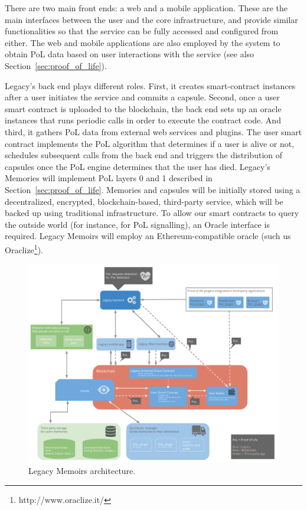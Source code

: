 There are two main front ends: a web and a mobile application. These are the main interfaces between the user and the core infrastructure, and provide similar functionalities so that the service can be fully accessed and configured from either.
The web and mobile applications are also employed by the system to obtain PoL data based on user interactions with the service (see also Section~\ref{sec:proof_of_life}).

Legacy’s back end plays different roles. First, it creates smart-contract instances after a user initiates the service and commits a capsule. Second, once a user smart contract is uploaded to the blockchain, the back end sets up an oracle instances that runs periodic calls in order to execute the contract code. And third, it gathers PoL data from external web services and plugins. The user smart contract implements the PoL algorithm that determines if a user is alive or not, schedules subsequent calls from the back end and triggers the distribution of capsules once the PoL engine determines that the user has died. 
Legacy's Memories will implement PoL layers 0 and 1 described in Section~\ref{sec:proof_of_life}.
Memories and capsules will be initially stored using a decentralized, encrypted, blockchain-based, third-party service, which will be backed up using traditional infrastructure.
To allow our smart contracts to query the outside world (for instance, for PoL signalling), an Oracle interface is required. Legacy Memoirs will employ an Ethereum-compatible oracle (such us Oraclize\footnote{http://www.oraclize.it/}).

\begin{figure}[h]
  \centering
  \includegraphics[scale=0.4]{fig/architecture_v02_hybrid}
  \caption{Legacy Memoirs architecture.}
  \label{fig:leg_v1_arch}
\end{figure} 

